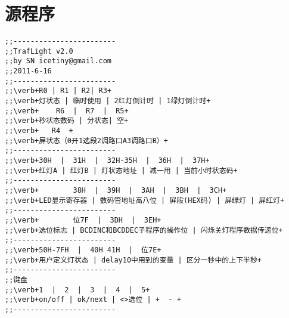 
\chapter{源程序}
\label{app:code}
\begin{lstlisting}[language={[x86masm]assembler},  escapeinside=""]
;;------------------------
;;TrafLight v2.0
;;by SN icetiny@gmail.com
;;2011-6-16
;;------------------------
;;\verb+R0 | R1 | R2| R3+
;;\verb+灯状态 | 临时使用 | 2红灯倒计时 | 1绿灯倒计时+    
;;\verb+	R6  |  R7  |  R5+		
;;\verb+秒状态数码 | 分状态| 空+
;;\verb+   R4  +
;;\verb+屏状态（0开1选段2调路口A3调路口B）+
;;------------------------
;;\verb+30H  |  31H  |  32H-35H  |  36H  |  37H+
;;\verb+红灯A | 红灯B | 灯状态地址 | 减一用 | 当前小时状态码+
;;------------------------
;;\verb+		38H  |  39H  |  3AH  |  3BH  |  3CH+	
;;\verb+LED显示寄存器 | 数码管地址高八位 | 屏段(HEX码) | 屏绿灯 | 屏红灯+
;;------------------------
;;\verb+		位7F  |  3DH  |  3EH+
;;\verb+选位标志 | BCDINC和BCDDEC子程序的操作位 | 闪烁关灯程序数据传递位+
;;------------------------
;;\verb+50H-7FH  |  40H 41H  |  位7E+
;;\verb+用户定义灯状态 | delay10中用到的变量 | 区分一秒中的上下半秒+
;;------------------------
;;键盘
;;\verb+1  |  2  |  3  |  4  |  5+
;;\verb+on/off | ok/next | <>选位 | +  - +
;;------------------------


\end{lstlisting}
